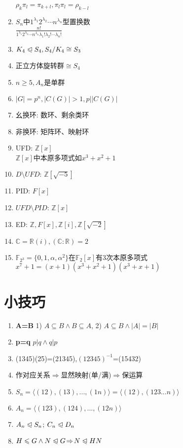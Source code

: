 \documentclass[b4paper, 10pt]{ctexart}
\newcommand*{\bb}[1]{\mathbb{#1}}
\newcommand*{\setZ}{\mathbb{Z}}
\newcommand*{\setR}{\mathbb{R}}
\newcommand*{\setC}{\mathbb{C}}
\newcommand*{\impl}{\Rightarrow}
\renewcommand*{\leq}{\leqslant}
\renewcommand*{\geq}{\geqslant}
\newcommand*{\nmsubgroupeq}{\trianglelefteqslant}
\newcommand*{\gengroup}[1]{\langle #1 \rangle}
\newcommand*{\ff}[1]{\bb{F}_{#1}}
\begin{document}
\begin{multicols}{3}
\begin{enumerate}
              $\rho_k\pi_l=\pi_{k+l},\pi_l\pi_l=\rho_{k-l}$
        \item $S_n$中$1^{\lambda_1} 2^{\lambda_2}\cdots n^{\lambda_n}$型置换数\\
              $\frac{n!}{1^{\lambda_1} 2^{\lambda_2}\cdots n^{\lambda_n} \lambda_1! \lambda_2! \cdots \lambda_n!}$
        \item $K_4 \nmsubgroupeq S_4, S_4/K_4 \cong S_3$
        \item 正立方体旋转群$\cong S_4$
        \item $n \geq 5, A_n$是单群
        \item $|G| = p^n, |C(G)| > 1, p | |C(G)|$
        \item 幺换环: 数环、剩余类环
        \item 非换环: 矩阵环、映射环
        \item UFD: $\setZ[x]$\\
              $\setZ[x]$中本原多项式如$x^3 + x^2 + 1$
        \item $D \!\setminus\! UFD$: $\setZ[\sqrt{-5}]$
        \item PID: $F[x]$
        \item $UFD \!\setminus\! PID$: $\setZ[x]$
        \item ED: $\setZ, F[x], \setZ[i], \setZ[\sqrt{-2}]$
        \item $\setC = \setR(i), (\setC : \setR) = 2$
        \item $\ff{2^3} \! = \! \{ 0, 1, \alpha, \alpha^2 \}$在$\ff{2}[x]$有3次本原多项式$x^7 + 1 = (x+1)(x^3 + x^2 + 1)(x^3 + x + 1)$
    \end{enumerate}

    \section{小技巧}
    \begin{enumerate}
        \item \textbf{A=B}  1) $A\subseteq B \wedge B\subseteq A$, 2) $A\subseteq B \wedge |A|=|B|$
        \item \textbf{p=q}  $p|q\wedge q|p$
        \item (1345)(25)=(21345),$(12345)^{-1}$=(15432)
        \item 作对应关系$\!\impl\!$显然映射(单/满)$\!\impl\!$保运算
        \item $S_n=\gengroup{(12),(13),...,(1n)}=\gengroup{(12),(123...n)}$
        \item $A_n=\gengroup{(123),(124),...,(12n)}$
        \item $A_n \nmsubgroupeq S_n$; $C_n \nmsubgroupeq D_n$
        \item $H\leq G \wedge N \nmsubgroupeq G \!\impl\! N\nmsubgroupeq HN$
    \end{enumerate}

\end{multicols}
\end{document}
